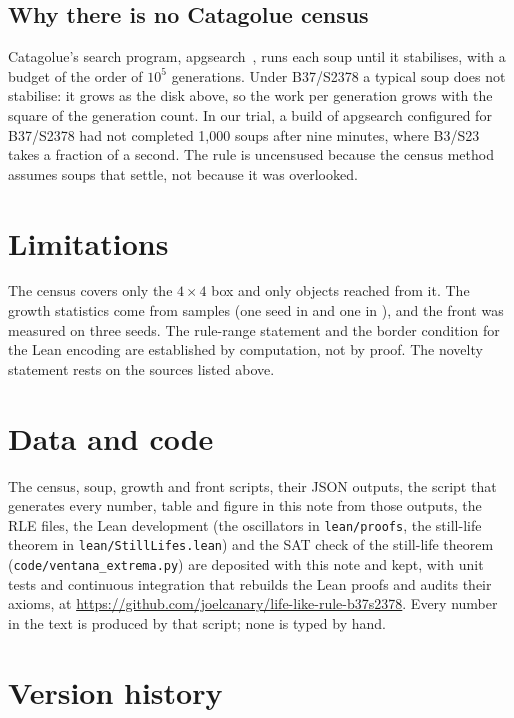 \documentclass[11pt,a4paper]{article}
\newcommand{\apgsopas}{1{,}000}
\begin{document}
\subsection{Why there is no Catagolue census}

Catagolue's search program, apgsearch~\cite{catagolue}, runs each soup until it
stabilises, with a budget of the order of $10^5$ generations. Under B37/S2378 a
typical soup does not stabilise: it grows as the disk above, so the work per generation
grows with the square of the generation count. In our trial, a build of apgsearch configured
for B37/S2378 had not completed \apgsopas{} soups after nine minutes, where B3/S23 takes a
fraction of a second. The rule is uncensused because the census method assumes soups
that settle, not because it was overlooked.

\section{Limitations}

The census covers only the $4\times4$ box and only objects reached from it. The growth
statistics come from samples (one seed in \muestraCasa{} and one in \muestraConway),
and the front was measured on three seeds. The rule-range statement and the border
condition for the Lean encoding are established by computation, not by proof. The
novelty statement rests on the sources listed above.

\section*{Data and code}

The census, soup, growth and front scripts, their JSON outputs, the script that
generates every number, table and figure in this note from those outputs, the RLE
files, the Lean development (the oscillators in \texttt{lean/proofs}, the still-life
theorem in \texttt{lean/StillLifes.lean}) and the SAT check of the still-life theorem
(\texttt{code/ventana\_extrema.py}) are deposited with this note and kept, with unit tests
and continuous integration that rebuilds the Lean proofs and audits their axioms, at
\url{https://github.com/joelcanary/life-like-rule-b37s2378}. Every number in the text
is produced by that script; none is typed by hand.

\section*{Version history}
\end{document}
